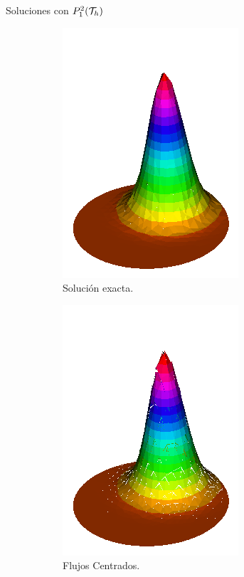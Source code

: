 \begin{frame}{Soluciones con $\relax{P}_1^2(\mathcal{T}_h)$}
\begin{figure}[h!]
\begin{subfigure}[b]{0.27\textwidth}
				\includegraphics[scale=0.22]{img/Conveccion_Reaccion/Recortes/steady_convect_react_exact_n_64.png}
				\caption{Solución exacta.}
			\end{subfigure}
			\begin{subfigure}[b]{0.27\textwidth}
				\centering
				\includegraphics[scale=0.22]{img/Conveccion_Reaccion/Recortes/steady_convect_react_approx_CF_n_64.png}
				\caption{Flujos Centrados.}
			\end{subfigure}
			\begin{subfigure}[b]{0.27\textwidth}
				\centering

\end{subfigure}
\end{figure}
\end{frame}
